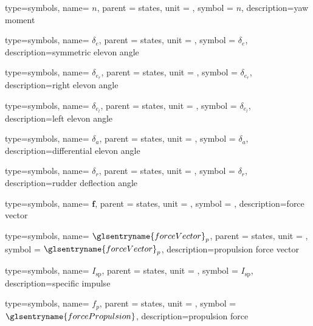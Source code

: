 {type=symbols,
	name= \ensuremath{n},
	parent = {states},
	unit = \unexpanded{\si{\newton\meter}},
	symbol = \ensuremath{n},
	description={yaw moment}
}

{type=symbols,
	name= \ensuremath{\delta_{e}},
	parent = {states},
	unit = \unexpanded{\si{\radian}},
	symbol = \ensuremath{\delta_{e}},
	description={symmetric elevon angle}
}

{type=symbols,
    name= \ensuremath{\delta_{e_{r}}},
    parent = {states},
    unit = \unexpanded{\si{\radian}},
    symbol = \ensuremath{\delta_{e_{r}}},
    description={right elevon angle}
}


{type=symbols,
    name= \ensuremath{\delta_{e_{l}}},
    parent = {states},
    unit = \unexpanded{\si{\radian}},
    symbol = \ensuremath{\delta_{e_{l}}},
    description={left elevon angle}
}



{type=symbols,
	name= \ensuremath{\delta_{a}},
	parent = {states},
	unit = \unexpanded{\si{\degree}},
	symbol = \ensuremath{\delta_{a}},
	description={differential elevon angle}
}

{type=symbols,
	name= \ensuremath{\delta_{r}},
	parent = {states},
	unit = \unexpanded{\si{\degree}},
	symbol = \ensuremath{\delta_{r}},
	description={rudder deflection angle}
}

{type=symbols,
	name= \ensuremath{\mathbf{f}},
	parent = {states},
	unit = \unexpanded{\si{\newton}},
	symbol = ,
	description={force vector}
}

{type=symbols,
	name= \ensuremath{{\glsentryname{forceVector}}_{p}},
	parent = {states},
	unit = \unexpanded{\si{\newton}},
	symbol = \ensuremath{{\glsentryname{forceVector}}_{p}},
	description={propulsion force vector}
}

{type=symbols,
	name= \ensuremath{I_\textrm{sp}},
	parent = {states},
	unit = \unexpanded{\si{\second}},
	symbol = \ensuremath{I_\textrm{sp}},
	description={specific impulse}
}


{type=symbols,
	name= \ensuremath{f_{p}},
	parent = {states},
	unit = \unexpanded{\si{\newton}},
	symbol = \ensuremath{\glsentryname{forcePropulsion}},
	description={propulsion force}
}


